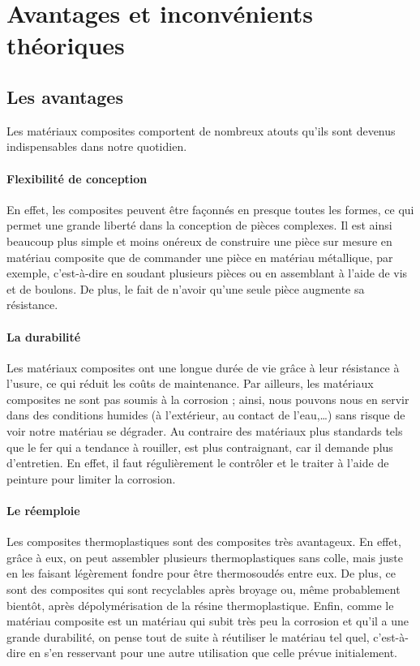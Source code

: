 \chapter{Avantages et inconvénients théoriques}


\section{Les avantages}

Les matériaux composites comportent de nombreux atouts qu’ils sont devenus indispensables dans notre quotidien. \cite{mayer2019b}

\subsubsection{Flexibilité de conception}
En effet, les composites peuvent être façonnés en presque toutes les formes, ce qui permet une grande liberté dans la conception de pièces complexes.
Il est ainsi beaucoup plus simple et moins onéreux de construire une pièce sur mesure en matériau composite que de commander une pièce en matériau métallique, par exemple, c’est-à-dire en soudant plusieurs pièces ou en assemblant à l’aide de vis et de boulons.
De plus, le fait de n’avoir qu’une seule pièce augmente sa résistance.

\subsubsection{La durabilité}

Les matériaux composites ont une longue durée de vie grâce à leur résistance à l’usure, ce qui réduit les coûts de maintenance.
Par ailleurs, les matériaux composites ne sont pas soumis à la corrosion ; ainsi, nous pouvons nous en servir dans des conditions humides (à l’extérieur, au contact de l’eau,…) sans risque de voir notre matériau se dégrader.
Au contraire des matériaux plus standards tels que le fer qui a tendance à rouiller, est plus contraignant, car il demande plus d’entretien.
En effet, il faut régulièrement le contrôler et le traiter à l’aide de peinture pour limiter la corrosion.

\subsubsection{Le réemploie}

Les composites thermoplastiques sont des composites très avantageux.
En effet, grâce à eux, on peut assembler plusieurs thermoplastiques sans colle, mais juste en les faisant légèrement fondre pour être thermosoudés entre eux.
De plus, ce sont des composites qui sont recyclables après broyage ou, même probablement bientôt, après dépolymérisation de la résine thermoplastique.
Enfin, comme le matériau composite est un matériau qui subit très peu la corrosion et qu’il a une grande durabilité, on pense tout de suite à réutiliser le matériau tel quel, c’est-à-dire en s’en resservant pour une autre utilisation que celle prévue initialement.


